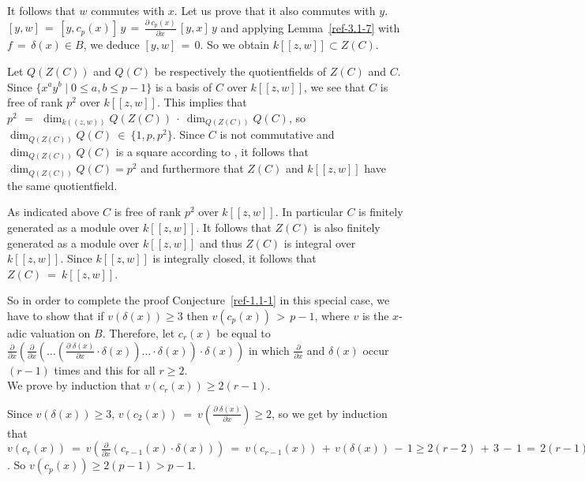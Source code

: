 \documentclass{amsart}
\numberwithin{equation}{section}
\theoremstyle{definition}
\theoremstyle{remark}
\begin{document}
It follows that $w$ commutes with $x$. Let us prove that it also
commutes with $y$. $\displaystyle{[y,w]  \,=\, [y,c_{p}(x)]\,y
\,=\, \frac{\partial \; c_{p}(x)}{\partial x} \, [y,x] \, y}$ and
applying Lemma~\ref{ref-3.1-7} with $f \,=\, \delta(x) \in B$, we
deduce $[y,w] \,=\, 0$.
So we obtain $k[[z,w]] \subset Z(C)$.

 Let $Q(Z(C))$ and  $Q(C)$ be respectively the quotientfields of
$Z(C)$ and $C$.
Since $\{x^{a}y^{b}\;|\;0 \leq a,b \leq p-1 \}$ is a basis of $C$
over $k[[z,w]]$, we see that $C$ is free of rank $p^{2}$ over
$k[[z,w]]$. This implies that 
$p^{2}~\,=\,~\dim_{k((z,w))}Q(Z(C))~\cdot~\dim_{Q(Z(C))}Q(C)$, so 
$\dim_{Q(Z(C))}Q(C)~\in~\{1,p,p^{2}\}$.
Since $C$ is not commutative and  $\dim_{Q(Z(C))}Q(C)$ is a
square according to   \cite{Cohn}, it follows
that $\dim_{Q(Z(C))}Q(C)=p^{2}$ and furthermore that $Z(C)$ and
$k[[z,w]]$ have the same quotientfield.

As indicated above $C$ is free of rank $p^{2}$
over $k[[z,w]]$. In particular $C$ is finitely generated as a module over
$k[[z,w]]$. It follows that $Z(C)$ is also finitely generated as a
module over $k[[z,w]]$ and thus  $Z(C)$ is integral over $k[[z,w]]$.
Since 
$k[[z,w]]$ is integrally closed, it  follows that $Z(C) \:=\:
k[[z,w]]$.

\medskip

 So in order to complete the proof Conjecture~\ref{ref-1.1-1} in
 this special case, we have to
show that if $v(\delta(x))\ge 3$ then $v(c_{p}(x)) \,>\, p-1$, where $v$ is the $x$-adic valuation
on $B$. Therefore, let $c_{r}(x)$ be equal to
$\displaystyle{\frac{\partial}{\partial x}
\left( \frac{\partial}{\partial x} \left( \ldots \left(
\frac{\partial \; \delta(x)}{\partial x} \cdot \delta(x) \right)
\ldots \cdot \delta(x) \right) \cdot \delta(x) \right)}$ in which
$\displaystyle{\frac{\partial}{\partial x}}$ and $\delta(x)$ occur
$(r-1)$ times and this for all $r \geq 2$. 
\\ We prove by induction that $v(c_r(x))\ge 2(r-1)$.

 Since $v(\delta(x)) \geq 3$, $\displaystyle{v(c_{2}(x))\:=\:v \left(
\frac{\partial \; \delta(x)}{\partial x} \right) \geq 2}$, 
so we get by induction that
\\ $v(c_{r}(x))\:=\:\displaystyle{v \left( \frac{\partial}{\partial x}
\left( c_{r-1}(x) \cdot \delta(x) \right) \right)} \:=\: v(c_{r-1}(x))
\,+\, v(\delta(x)) \,-\,1 \geq 2(r-2) \,+\,3\,-\,1\,=\,2(r-1)$. So
$v(c_{p}(x)) \geq 2(p-1) > p-1$.
\end{document}
